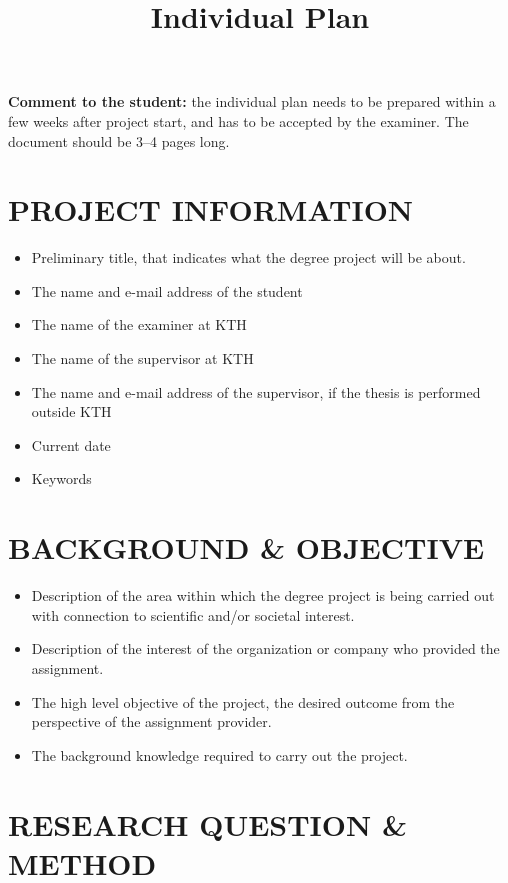 \documentclass[11pt]{article}
\title{Individual Plan}
\author{}
\date{}
\begin{document}
\maketitle

\noindent\textbf{Comment to the student:} the individual plan needs to be prepared within a few weeks after project start, and has to be accepted by the examiner. The document should be 3--4 pages long.

\vspace{1em}
\section*{PROJECT INFORMATION}

\begin{itemize}[leftmargin=*, label={}]
  \item Preliminary title, that indicates what the degree project will be about.
  \item The name and e-mail address of the student
  \item The name of the examiner at KTH
  \item The name of the supervisor at KTH
  \item The name and e-mail address of the supervisor, if the thesis is performed outside KTH
  \item Current date
  \item Keywords
\end{itemize}

\section*{BACKGROUND \& OBJECTIVE}

\begin{itemize}[leftmargin=*, label={}]
  \item Description of the area within which the degree project is being carried out with connection to scientific and/or societal interest.
  \item Description of the interest of the organization or company who provided the assignment.
  \item The high level objective of the project, the desired outcome from the perspective of the assignment provider.
  \item The background knowledge required to carry out the project.
\end{itemize}

\section*{RESEARCH QUESTION \& METHOD}
\end{document}
